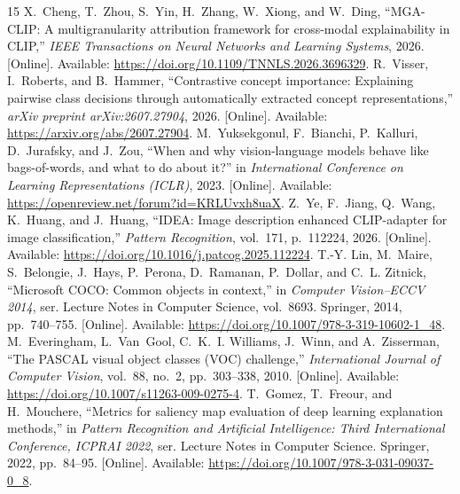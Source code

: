 \begin{thebibliography}{15}
\newpage
{}
X.~Cheng, T.~Zhou, S.~Yin, H.~Zhang, W.~Xiong, and W.~Ding, ``{MGA-CLIP}: A
multigranularity attribution framework for cross-modal explainability in
{CLIP},'' \emph{IEEE Transactions on Neural Networks and Learning Systems},
2026. [Online]. Available:
\url{https://doi.org/10.1109/TNNLS.2026.3696329}.
R.~Visser, I.~Roberts, and B.~Hammer, ``Contrastive concept importance:
Explaining pairwise class decisions through automatically extracted concept
representations,'' \emph{arXiv preprint arXiv:2607.27904}, 2026. [Online]. Available:
\url{https://arxiv.org/abs/2607.27904}.
M.~Yuksekgonul, F.~Bianchi, P.~Kalluri, D.~Jurafsky, and J.~Zou, ``When and why
vision-language models behave like bags-of-words, and what to do about it?'' in
\emph{International Conference on Learning Representations (ICLR)}, 2023.
[Online]. Available: \url{https://openreview.net/forum?id=KRLUvxh8uaX}.
Z.~Ye, F.~Jiang, Q.~Wang, K.~Huang, and J.~Huang, ``{IDEA}: Image description
enhanced {CLIP}-adapter for image classification,'' \emph{Pattern Recognition},
vol.~171, p.~112224, 2026. [Online]. Available:
\url{https://doi.org/10.1016/j.patcog.2025.112224}.
T.-Y. Lin, M.~Maire, S.~Belongie, J.~Hays, P.~Perona, D.~Ramanan, P.~Dollar,
and C.~L. Zitnick, ``Microsoft {COCO}: Common objects in context,'' in
\emph{Computer Vision--ECCV 2014}, ser. Lecture Notes in Computer Science,
vol.~8693. Springer, 2014, pp.~740--755. [Online]. Available:
\url{https://doi.org/10.1007/978-3-319-10602-1_48}.
M.~Everingham, L.~Van~Gool, C.~K.~I. Williams, J.~Winn, and A.~Zisserman,
``The {PASCAL} visual object classes ({VOC}) challenge,'' \emph{International
Journal of Computer Vision}, vol.~88, no.~2, pp.~303--338, 2010. [Online]. Available:
\url{https://doi.org/10.1007/s11263-009-0275-4}.
T.~Gomez, T.~Freour, and H.~Mouchere, ``Metrics for saliency map evaluation of
deep learning explanation methods,'' in \emph{Pattern Recognition and
Artificial Intelligence: Third International Conference, ICPRAI 2022}, ser.
Lecture Notes in Computer Science. Springer, 2022, pp.~84--95. [Online]. Available:
\url{https://doi.org/10.1007/978-3-031-09037-0_8}.
\end{thebibliography}
